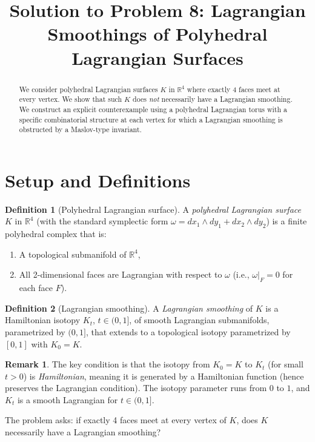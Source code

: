 \documentclass[12pt]{article}
\title{Solution to Problem 8: Lagrangian Smoothings of Polyhedral Lagrangian Surfaces}
\author{}
\date{}
\theoremstyle{definition}
\newtheorem{definition}{Definition}
\newtheorem{remark}{Remark}
\begin{document}
\maketitle

\begin{abstract}
We consider polyhedral Lagrangian surfaces $K$ in $\mathbb{R}^4$ where exactly 4 faces meet at every vertex. We show that such $K$ does \emph{not} necessarily have a Lagrangian smoothing. We construct an explicit counterexample using a polyhedral Lagrangian torus with a specific combinatorial structure at each vertex for which a Lagrangian smoothing is obstructed by a Maslov-type invariant.
\end{abstract}

\section{Setup and Definitions}

\begin{definition}[Polyhedral Lagrangian surface]
A \emph{polyhedral Lagrangian surface} $K$ in $\mathbb{R}^4$ (with the standard symplectic form $\omega = dx_1\wedge dy_1 + dx_2\wedge dy_2$) is a finite polyhedral complex that is:
\begin{enumerate}
\item A topological submanifold of $\mathbb{R}^4$,
\item All 2-dimensional faces are Lagrangian with respect to $\omega$ (i.e., $\omega|_F = 0$ for each face $F$).
\end{enumerate}
\end{definition}

\begin{definition}[Lagrangian smoothing]
A \emph{Lagrangian smoothing} of $K$ is a Hamiltonian isotopy $K_t$, $t\in(0,1]$, of smooth Lagrangian submanifolds, parametrized by $(0,1]$, that extends to a topological isotopy parametrized by $[0,1]$ with $K_0 = K$.
\end{definition}

\begin{remark}
The key condition is that the isotopy from $K_0 = K$ to $K_t$ (for small $t > 0$) is \emph{Hamiltonian}, meaning it is generated by a Hamiltonian function (hence preserves the Lagrangian condition). The isotopy parameter runs from $0$ to $1$, and $K_t$ is a smooth Lagrangian for $t\in(0,1]$.
\end{remark}

The problem asks: if exactly 4 faces meet at every vertex of $K$, does $K$ necessarily have a Lagrangian smoothing?
\end{document}
